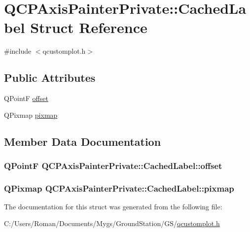 \hypertarget{struct_q_c_p_axis_painter_private_1_1_cached_label}{}\section{Q\+C\+P\+Axis\+Painter\+Private\+:\+:Cached\+Label Struct Reference}
\label{struct_q_c_p_axis_painter_private_1_1_cached_label}


{\ttfamily \#include $<$qcustomplot.\+h$>$}

\subsection*{Public Attributes}
\begin{DoxyCompactItemize}
\item 
Q\+Point\+F \hyperlink{struct_q_c_p_axis_painter_private_1_1_cached_label_a5f502db71c92e572f1e6f44f62c59d8e}{offset}
\item 
Q\+Pixmap \hyperlink{struct_q_c_p_axis_painter_private_1_1_cached_label_a461597cbd470914a9d24b64d16037a88}{pixmap}
\end{DoxyCompactItemize}


\subsection{Member Data Documentation}
\hypertarget{struct_q_c_p_axis_painter_private_1_1_cached_label_a5f502db71c92e572f1e6f44f62c59d8e}{}
\subsubsection[{offset}]{\setlength{\rightskip}{0pt plus 5cm}Q\+Point\+F Q\+C\+P\+Axis\+Painter\+Private\+::\+Cached\+Label\+::offset}\label{struct_q_c_p_axis_painter_private_1_1_cached_label_a5f502db71c92e572f1e6f44f62c59d8e}
\hypertarget{struct_q_c_p_axis_painter_private_1_1_cached_label_a461597cbd470914a9d24b64d16037a88}{}
\subsubsection[{pixmap}]{\setlength{\rightskip}{0pt plus 5cm}Q\+Pixmap Q\+C\+P\+Axis\+Painter\+Private\+::\+Cached\+Label\+::pixmap}\label{struct_q_c_p_axis_painter_private_1_1_cached_label_a461597cbd470914a9d24b64d16037a88}


The documentation for this struct was generated from the following file\+:\begin{DoxyCompactItemize}
\item 
C\+:/\+Users/\+Roman/\+Documents/\+Mygs/\+Ground\+Station/\+G\+S/\hyperlink{qcustomplot_8h}{qcustomplot.\+h}\end{DoxyCompactItemize}
